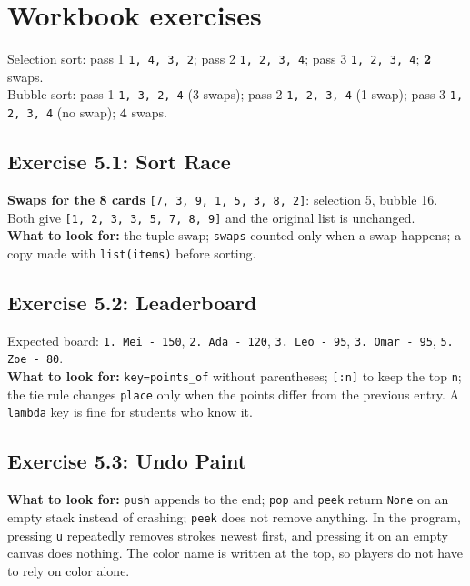 
\section{Workbook exercises}
\begin{answer}
Selection sort: pass 1 \texttt{1, 4, 3, 2}; pass 2 \texttt{1, 2, 3, 4}; pass 3 \texttt{1, 2, 3, 4}; \textbf{2} swaps.\\
Bubble sort: pass 1 \texttt{1, 3, 2, 4} (3 swaps); pass 2 \texttt{1, 2, 3, 4} (1 swap); pass 3 \texttt{1, 2, 3, 4} (no swap); \textbf{4} swaps.
\end{answer}

\subsection{Exercise 5.1: Sort Race}
\begin{answer}
\textbf{Swaps for the 8 cards} \texttt{[7, 3, 9, 1, 5, 3, 8, 2]}: selection 5, bubble 16. Both give \texttt{[1, 2, 3, 3, 5, 7, 8, 9]} and the original list is unchanged.\\
\textbf{What to look for:} the tuple swap; \texttt{swaps} counted only when a swap happens; a copy made with \texttt{list(items)} before sorting.
\end{answer}

\subsection{Exercise 5.2: Leaderboard}
\begin{answer}
Expected board: \texttt{1. Mei - 150}, \texttt{2. Ada - 120}, \texttt{3. Leo - 95}, \texttt{3. Omar - 95}, \texttt{5. Zoe - 80}.\\
\textbf{What to look for:} \texttt{key=points\_of} without parentheses; \texttt{[:n]} to keep the top \texttt{n}; the tie rule changes \texttt{place} only when the points differ from the previous entry. A \texttt{lambda} key is fine for students who know it.
\end{answer}

\subsection{Exercise 5.3: Undo Paint}
\begin{answer}
\textbf{What to look for:} \texttt{push} appends to the end; \texttt{pop} and \texttt{peek} return \texttt{None} on an empty stack instead of crashing; \texttt{peek} does not remove anything.
In the program, pressing \texttt{u} repeatedly removes strokes newest first, and pressing it on an empty canvas does nothing.
The color name is written at the top, so players do not have to rely on color alone.
\end{answer}

